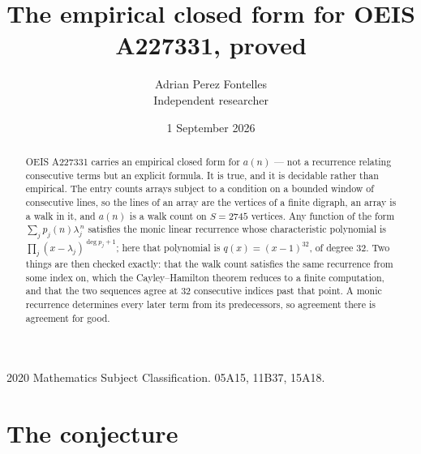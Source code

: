 \documentclass[11pt,a4paper]{article}
\title{The empirical closed form for OEIS A227331, proved}
\author{Adrian Perez Fontelles\\ \small Independent researcher}
\date{1 September 2026}
\theoremstyle{plain}
\theoremstyle{definition}
\begin{document}
\maketitle

\begin{abstract}
OEIS A227331 carries an empirical closed form for $a(n)$ --- not a recurrence relating
consecutive terms but an explicit formula. It is true, and it is decidable rather than
empirical. The entry counts arrays subject to a condition on a bounded window of consecutive lines, so the lines of an array are the
vertices of a finite digraph, an array is a walk in it, and $a(n)$ is a walk count on
$S=2745$ vertices. Any function of the form $\sum_j p_j(n)\lambda_j^{\,n}$ satisfies the
monic linear recurrence whose characteristic polynomial is
$\prod_j(x-\lambda_j)^{\deg p_j+1}$; here that polynomial is $q(x)=(x-1)^{32}$, of degree
$32$. Two things are then checked exactly: that the walk count satisfies the same
recurrence from some index on, which the Cayley--Hamilton theorem reduces to a finite
computation, and that the two sequences agree at $32$ consecutive indices past that
point. A monic recurrence determines every later term from its predecessors, so agreement
there is agreement for good.
\end{abstract}

\noindent\small 2020 Mathematics Subject Classification. 05A15, 11B37, 15A18.\normalsize

\section{The conjecture}
\end{document}
